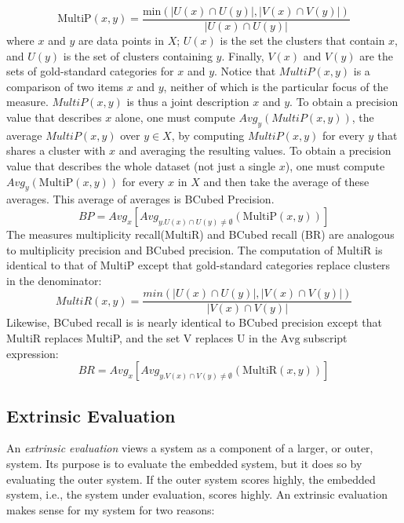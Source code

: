 \begin{equation}
\text{MultiP}(x,y) = \frac{\text{min}(|U(x)\cap U(y)|, |V(x) \cap V(y)|)}{|U(x) \cap U(y)|}
\end{equation}
where $x$ and $y$ are data points in $X$; $U(x)$ is the set the clusters that contain $x$, 
and $U(y)$ is the set of clusters containing $y$.
Finally, 
$V(x)$ and $V(y)$ are the sets of gold-standard categories for $x$ and $y$. 
Notice that $MultiP(x,y)$ is a comparison of two items $x$ and $y$, neither of which is the 
particular focus of the measure. $MultiP(x,y)$ is thus a joint description $x$ and $y$. 
To obtain a precision value that describes $x$ alone, one must compute $Avg_{y}(MultiP (x,y))$, the 
average $MultiP(x,y)$ over $y \in X$, by computing $MultiP(x,y)$ for every $y$ that shares a cluster with $x$ 
and averaging the resulting values. To obtain a precision value that describes the whole dataset (not just a single $x$), 
one must compute $Avg_y(\text{MultiP}(x,y))$ for every $x$ in $X$ and then take the average of these averages. 
This average of averages is BCubed Precision. 
\begin{equation}
BP=Avg_x [Avg_{y.U(x) \cap U(y) \neq \emptyset}(\text{MultiP}(x,y))]
\end{equation}
The measures multiplicity recall(MultiR) and BCubed recall (BR) are analogous to multiplicity precision and
 BCubed precision. The computation of MultiR is identical to that of MultiP 
 except that gold-standard categories replace clusters in the denominator: 
\begin{equation}
MultiR(x,y) = \frac{min(|U(x) \cap U(y)|, |V(x) \cap V (y)|)}{|V(x) \cap V(y)|}
\end{equation}
Likewise, BCubed recall is is nearly identical to BCubed precision except that MultiR replaces MultiP, and the set V replaces U in the $\text{Avg}$ subscript expression:
\begin{equation} 
BR = Avg_x [Avg_{y.V(x) \cap V(y) \neq \emptyset}(\text{MultiR}(x,y))]
\end{equation}

\subsection{Extrinsic Evaluation} \label{sec:eval-extrinsic} An \emph{extrinsic evaluation} 
views a system as a component of a larger, or outer, system. 
Its purpose is to evaluate the embedded system, but it does so by evaluating the outer 
system. If the outer system scores highly,
the embedded system, i.e., the system under evaluation, scores highly.
An extrinsic evaluation makes sense for my system for two reasons:

